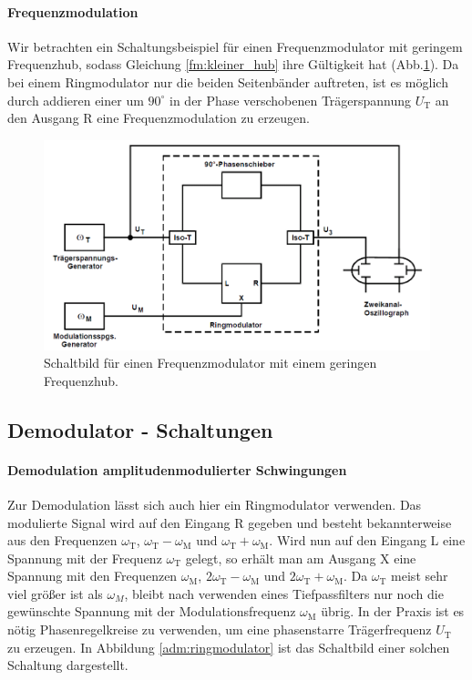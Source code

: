 \paragraph{Frequenzmodulation}
Wir betrachten ein Schaltungsbeispiel für einen Frequenzmodulator mit geringem Frequenzhub, sodass Gleichung \eqref{fm:kleiner_hub} ihre Gültigkeit hat (Abb.\ref{fm:schaltbild}).
Da bei einem Ringmodulator nur die beiden Seitenbänder auftreten, ist es möglich durch addieren einer um $90^\circ$ in der Phase verschobenen Trägerspannung $U_\text{T}$ an den Ausgang R eine Frequenzmodulation zu erzeugen.

\begin{figure}[!h]
    \centering
    \includegraphics[width = 14cm]{images/fm_schaltbild.png}
    \caption{Schaltbild für einen Frequenzmodulator mit einem geringen Frequenzhub.}
    \label{fm:schaltbild}
\end{figure}

\subsection{Demodulator - Schaltungen}
\label{subsec:debye}

\paragraph{Demodulation amplitudenmodulierter Schwingungen}
Zur Demodulation lässt sich auch hier ein Ringmodulator verwenden.
Das modulierte Signal wird auf den Eingang R gegeben und besteht bekannterweise aus den Frequenzen $\omega_\text{T}$, $\omega_\text{T} - \omega_\text{M}$ und $\omega_\text{T} + \omega_\text{M}$.
Wird nun auf den Eingang L eine Spannung mit der Frequenz $\omega_\text{T}$ gelegt, so erhält man am Ausgang X eine Spannung mit den Frequenzen $\omega_\text{M}$, $2\omega_\text{T} - \omega_\text{M}$ und $2\omega_\text{T} + \omega_\text{M}$.
Da $\omega_\text{T}$ meist sehr viel größer ist als $\omega_{M}$, bleibt nach verwenden eines Tiefpassfilters nur noch die gewünschte Spannung mit der Modulationsfrequenz $\omega_\text{M}$ übrig.
In der Praxis ist es nötig Phasenregelkreise zu verwenden, um eine phasenstarre Trägerfrequenz $U_\text{T}$ zu erzeugen.
In Abbildung \ref{adm:ringmodulator} ist das Schaltbild einer solchen Schaltung dargestellt.

